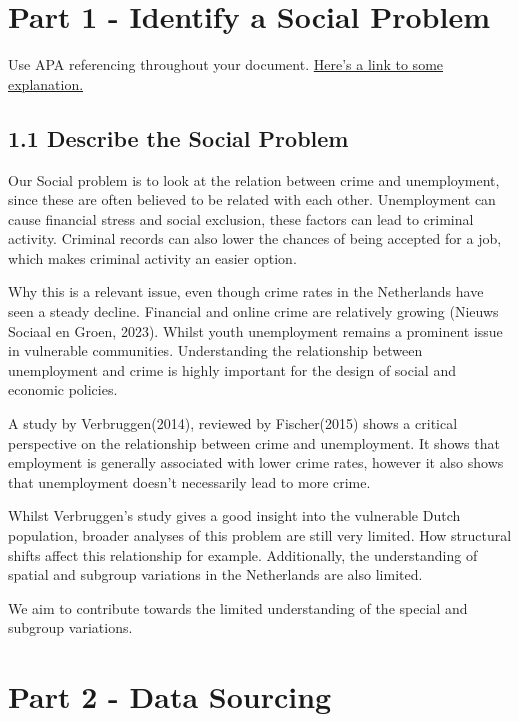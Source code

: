 \documentclass[
]{article}
\begin{document}
\section{Part 1 - Identify a Social
Problem}\label{part-1---identify-a-social-problem}

Use APA referencing throughout your document.
\href{https://www.mendeley.com/guides/apa-citation-guide/}{Here's a link
to some explanation.}

\subsection{1.1 Describe the Social
Problem}\label{describe-the-social-problem}

Our Social problem is to look at the relation between crime and
unemployment, since these are often believed to be related with each
other. Unemployment can cause financial stress and social exclusion,
these factors can lead to criminal activity. Criminal records can also
lower the chances of being accepted for a job, which makes criminal
activity an easier option.

Why this is a relevant issue, even though crime rates in the Netherlands
have seen a steady decline. Financial and online crime are relatively
growing (Nieuws Sociaal en Groen, 2023). Whilst youth unemployment
remains a prominent issue in vulnerable communities. Understanding the
relationship between unemployment and crime is highly important for the
design of social and economic policies.

A study by Verbruggen(2014), reviewed by Fischer(2015) shows a critical
perspective on the relationship between crime and unemployment. It shows
that employment is generally associated with lower crime rates, however
it also shows that unemployment doesn't necessarily lead to more crime.

Whilst Verbruggen's study gives a good insight into the vulnerable Dutch
population, broader analyses of this problem are still very limited. How
structural shifts affect this relationship for example. Additionally,
the understanding of spatial and subgroup variations in the Netherlands
are also limited.

We aim to contribute towards the limited understanding of the special
and subgroup variations.

\section{Part 2 - Data Sourcing}\label{part-2---data-sourcing}
\end{document}
